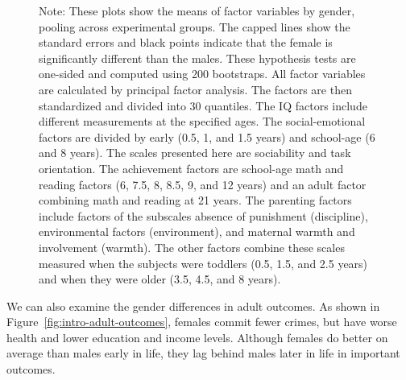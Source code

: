 \begin{figure}
Note: These plots show the means of factor variables by gender, pooling across experimental groups. The capped lines show the standard errors and black points indicate that the female is significantly different than the males. These hypothesis tests are one-sided and computed using 200 bootstraps. All factor variables are calculated by principal factor analysis. The factors are then standardized and divided into 30 quantiles. The IQ factors include different measurements at the specified ages. The social-emotional factors are divided by early (0.5, 1, and 1.5 years) and school-age (6 and 8 years). The scales presented here are sociability and task orientation. The achievement factors are school-age math and reading factors (6, 7.5, 8, 8.5, 9, and 12 years) and an adult factor combining math and reading at 21 years. The parenting factors include factors of the subscales absence of punishment (discipline), environmental factors (environment), and maternal warmth and involvement (warmth). The other factors combine these scales measured when the subjects were toddlers (0.5, 1.5, and 2.5 years) and when they were older (3.5, 4.5, and 8 years).
\end{figure}

We can also examine the gender differences in adult outcomes. As shown in Figure~\ref{fig:intro-adult-outcomes}, females commit fewer crimes, but have worse health and lower education and income levels. Although females do better on average than males early in life, they lag behind males later in life in important outcomes.

